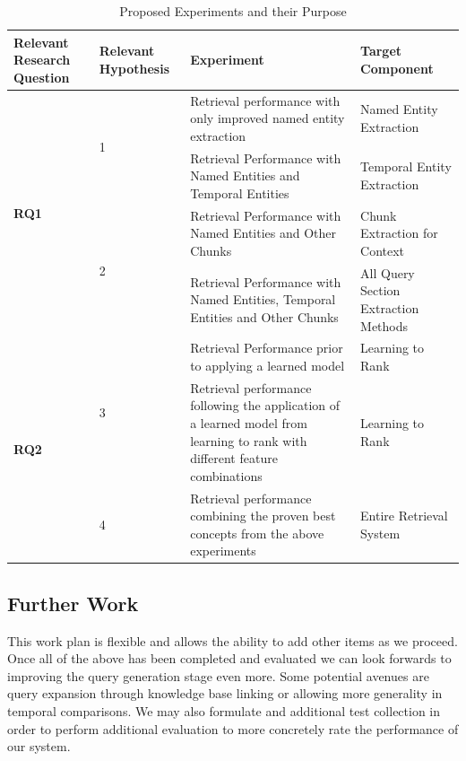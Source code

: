 \documentclass{mprop}
\begin{document}
\begin{table}[H]
\centering
\begin{tabular}{|p{2cm}|p{2cm}|p{6cm}|p{4cm}|}
\hline
Relevant Research Question & Relevant Hypothesis & Experiment & Target Component \\ \hline
\multirow{4}{*}{\textbf{RQ1}} & \multirow{2}{*}{1} & Retrieval performance with only improved named entity extraction & Named Entity Extraction \\ \cline{3-4}
& & Retrieval Performance with Named Entities and Temporal Entities & Temporal Entity Extraction \\ \cline{2-4}
& \multirow{2}{*}{2} &  Retrieval Performance with Named Entities and Other Chunks & Chunk Extraction for Context \\ \cline{3-4}
& & Retrieval Performance with Named Entities, Temporal Entities and Other Chunks & All Query Section Extraction Methods \\ \cline {1-4}
\multirow{3}{*}{\textbf{RQ2}} & \multirow{2}{*}{3} & Retrieval Performance prior to applying a learned model & Learning to Rank \\ \cline{3-4}
& & Retrieval performance following the application of a learned model from learning to rank with different feature combinations & Learning to Rank \\ \cline{2-4}
& 4 & Retrieval performance combining the proven best concepts from the above experiments & Entire Retrieval System \\ \cline{1-4}
\end{tabular}
\caption{Proposed Experiments and their Purpose}
\label{proposed_experiments}
\end{table}

\subsection{Further Work}
This work plan is flexible and allows the ability to add other items as we proceed. 
Once all of the above has been completed and evaluated we can look forwards to improving the query generation stage even more. 
Some potential avenues are query expansion through knowledge base linking or allowing more generality in temporal comparisons. 
We may also formulate and additional test collection in order to perform additional evaluation to more concretely rate the performance of our system.
\end{document}
